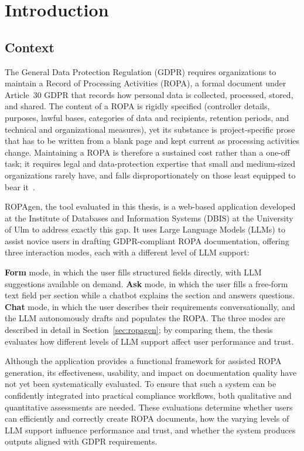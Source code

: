 \chapter{Introduction}
\label{ch:introduction}

\section{Context}
The General Data Protection Regulation (GDPR) requires organizations to maintain a Record of Processing Activities (ROPA), a formal document under Article~30 GDPR that records how personal data is collected, processed, stored, and shared. The content of a ROPA is rigidly specified (controller details, purposes, lawful bases, categories of data and recipients, retention periods, and technical and organizational measures), yet its substance is project-specific prose that has to be written from a blank page and kept current as processing activities change. Maintaining a ROPA is therefore a sustained cost rather than a one-off task; it requires legal and data-protection expertise that small and medium-sized organizations rarely have, and falls disproportionately on those least equipped to bear it~\cite{schwerinSystematicComparisonOpen2024}.

ROPAgen, the tool evaluated in this thesis, is a web-based application developed at the Institute of Databases and Information Systems (DBIS) at the University of Ulm to address exactly this gap.
It uses Large Language Models (LLMs) to assist novice users in drafting GDPR-compliant ROPA documentation, offering three interaction modes, each with a different level of LLM support:

\textbf{Form} mode, in which the user fills structured fields directly, with LLM suggestions available on demand.
\textbf{Ask} mode, in which the user fills a free-form text field per section while a chatbot explains the section and answers questions.
\textbf{Chat} mode, in which the user describes their requirements conversationally, and the LLM autonomously drafts and populates the ROPA.
The three modes are described in detail in Section~\ref{sec:ropagen}; by comparing them, the thesis evaluates how different levels of LLM support affect user performance and trust.

Although the application provides a functional framework for assisted ROPA generation, its effectiveness, usability, and impact on documentation quality have not yet been systematically evaluated. To ensure that such a system can be confidently integrated into practical compliance workflows, both qualitative and quantitative assessments are needed. These evaluations determine whether users can efficiently and correctly create ROPA documents, how the varying levels of LLM support influence performance and trust, and whether the system produces outputs aligned with GDPR requirements.

